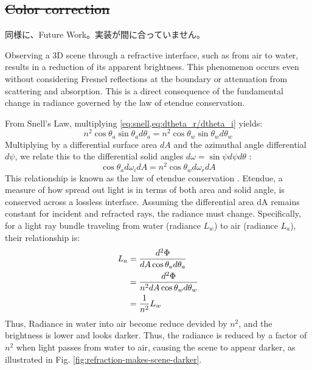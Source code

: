 \subsection{\sout{Color correction}}\label{sec:color-correction}
同様に、Future Work。実装が間に合っていません。

Observing a 3D scene through a refractive interface, such as from air to water, results in a reduction of its apparent brightness. 
This phenomenon occurs even without considering Fresnel reflections at the boundary \parencite{frestnel_law} or attenuation from scattering and absorption. 
This is a direct consequence of the fundamental change in radiance governed by the law of etendue conservation. 

From Snell's Law, multiplying \cref{eq:snell,eq:dtheta_r/dtheta_i} yields:
\begin{equation}
  n^2 \cos \theta_a \sin \theta_a d \theta_a = n^2 \cos \theta_w \sin \theta_w d \theta_w
\end{equation}
Multiplying by a differential surface area  $dA$  and the azimuthal angle differential $d \psi$, we relate this to the differential solid angles $d\omega = \sin\psi d\psi d\theta$ \parencite{solid_angle}:
\begin{equation}\label{eq:etendue_preservation}
  \cos\theta_a d\omega_i dA = n^2 \cos\theta_w d\omega_r dA
\end{equation}
This relationship is known as the law of etendue conservation \parencite{etendue}. 
Etendue, a measure of how spread out light is in terms of both area and solid angle, is conserved across a lossless interface. 
Assuming the differential area dA remains constant for incident and refracted rays, the radiance must change. 
Specifically, for a light ray bundle traveling from water (radiance $L_w$) to air (radiance $L_a$), their relationship is:
\begin{align}\label{eq:radiance_between_air_and_water}
  L_a &= \frac{d^2 \Phi }{dA \cos\theta_a d\theta_a} \notag \\
      &= \frac{d^2 \Phi }{n^2 dA \cos\theta_w d\theta_w} \notag \\
      &= \frac{1}{n^2} L_w 
\end{align}
Thus, Radiance in water into air become reduce devided by $n^2$, and the brightness is lower and looks darker.
Thus, the radiance is reduced by a factor of $n^2$ when light passes from water to air, causing the scene to appear darker, as illustrated in Fig. \ref{fig:refraction-makes-scene-darker}.

